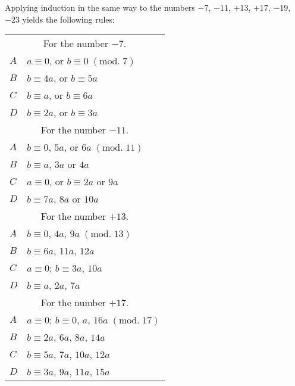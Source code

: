 \documentclass[twoside,12pt]{memoir}
\renewcommand{\pmod}[1]{\;(\textrm{mod.}\;#1)}
\begin{document}
Applying induction in the same way to the numbers \(-7\), \(-11\), \(+13\), \(+17\), \(-19\), \(-23\) yields the following rules:
\begin{center}
\begin{tabular}{l|l}
\multicolumn{2}{c}{For the number \(-7\).}\\
\(A\) & \(a \equiv 0\), or \(b \equiv 0\pmod{7}\) \\
\(B\) & \(b \equiv 4 a\), or \(b \equiv 5 a\) \\
\(C\) & \(b \equiv a\), or \(b \equiv 6 a\) \\
\(D\) & \(b \equiv 2 a\), or \(b \equiv 3 a\) \\
\multicolumn{2}{c}{For the number \(-11\).}\\
\(A\) & \(b \equiv 0\), \(5 a\), or \(6 a\pmod{11}\) \\
\(B\) & \(b \equiv a\), \(3 a\) or \(4 a\) \\
\(C\) & \(a \equiv 0\), or \(b \equiv 2 a\) or \(9 a\) \\
\(D\) & \(b \equiv 7 a\), \(8 a\) or \(10 a\)\\
\multicolumn{2}{c}{For the number \(+13\).}\\
\(A\) & \(b \equiv 0\), \(4a\), \(9 a\pmod{13}\) \\
\(B\) & \(b \equiv 6 a\), \(11 a\), \(12 a\) \\
\(C\) & \(a \equiv 0\); \(b \equiv 3 a\), \(10 a\) \\
\(D\) & \(b \equiv a\), \(2 a\), \(7 a\)\\
\multicolumn{2}{c}{For the number \(+17\).}\\
\(A\) & \(a \equiv 0\); \(b \equiv 0\), \(a\), \(16 a\pmod{17}\)\\
\(B\) & \(b \equiv 2 a\), \(6 a\), \(8 a\), \(14 a\)\\
\(C\) & \(b \equiv 5 a\), \(7 a\), \(10 a\), \(12 a\)\\
\(D\) & \(b \equiv 3 a\), \(9 a\), \(11 a\), \(15 a\)
\end{tabular}\\
\pagebreak%


\end{center}
\end{document}
